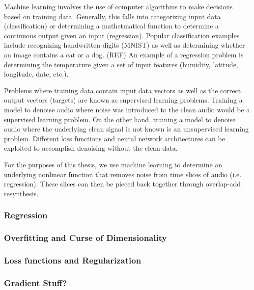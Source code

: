 Machine learning involves the use of computer algorithms to make decisions based on training data. Generally, this falls into categorizing input data (classification) or determining a mathetmatical function to determine a continuous output given an input (regression). Popular classification examples include recognizing handwritten digits (MNIST) as well as determining whether an image contains a cat or a dog. (REF) An example of a regression problem is determining the temperature given a set of input features (humidity, latitude, longitude, date, etc.).

Problems where training data contain input data vectors as well as the correct output vectors (targets) are known as supervised learning problems. Training a model to denoise audio where noise was introduced to the clean audio would be a supervised learning problem. On the other hand, training a model to denoise audio where the underlying clean signal is not known is an unsupervised learning problem. Different loss functions and neural network architectures can be exploited to accomplish denoising without the clean data.

For the purposes of this thesis, we use machine learning to determine an underlying nonlinear function that removes noise from time slices of audio (i.e. regression). These slices can then be pieced back together through overlap-add resynthesis.

\subsubsection{Regression}



\subsubsection{Overfitting and Curse of Dimensionality}


\subsubsection{Loss functions and Regularization}


\subsubsection{Gradient Stuff?}



